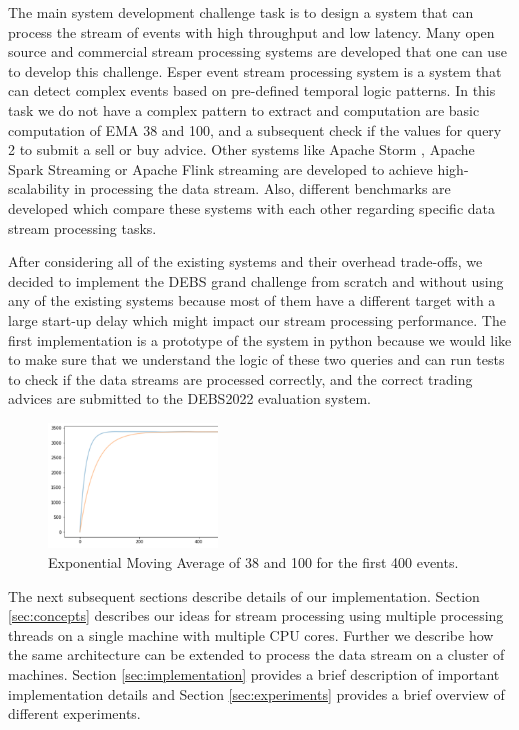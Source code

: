 The main system development challenge task is to design a system that can process the stream of events with high throughput and low latency. 
Many open source and commercial stream processing systems are developed that one can use to develop this challenge. 
Esper event stream processing system \cite{Bernhardt2007} is a system that can detect complex events based on pre-defined temporal logic patterns. 
In this task we do not have a complex pattern to extract and computation are basic computation of EMA 38 and 100, and a subsequent check if the values for 
query 2 to submit a sell or buy advice. Other systems like Apache Storm \cite{8288619}, Apache Spark Streaming \cite{zaharia2010spark} or 
Apache Flink streaming \cite{alexandrov2014stratosphere} are developed to achieve high-scalability in processing the data stream. 
Also, different benchmarks are developed  \cite{8701904} which compare these systems with each other regarding specific data 
stream processing tasks. 

After considering all of the existing systems and their overhead trade-offs, we decided to implement the DEBS grand challenge from scratch and 
without using any of the existing systems because most of them have a different target with a large start-up delay which might impact 
our stream processing performance. The first implementation is a prototype of the system in python because we would like to make sure 
that we understand the logic of these two queries and can run tests to check if the data streams are processed correctly, and the correct 
trading advices are submitted to the DEBS2022 evaluation system. 



\begin{figure}[!ht]
    \begin{center}
        \includegraphics[width=0.4\textwidth]{./images/query2_example_200.png}
        \caption{Exponential Moving Average of 38 and 100 for the first 400 events.}
        \label{fig:EMA200}
    \end{center}
\end{figure}


The next subsequent sections describe details of our implementation. Section \ref{sec:concepts} describes our ideas for 
stream processing using multiple processing threads on a single machine with multiple CPU cores. Further we describe how the same 
architecture can be extended to process the data stream on a cluster of machines.  Section \ref{sec:implementation} provides 
a brief description of important implementation details and Section \ref{sec:experiments} provides a brief overview of different 
experiments.


